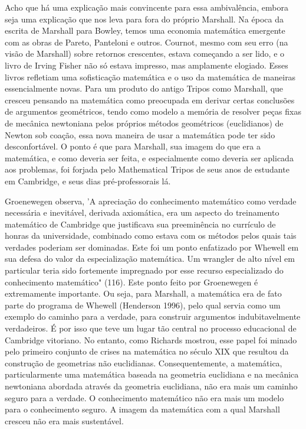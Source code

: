 \documentclass[12pt]{article}
\begin{document}
Acho que há uma explicação mais convincente para essa ambivalência, embora seja uma explicação que nos leva para fora do próprio Marshall. Na época da escrita de Marshall para Bowley, temos uma economia matemática emergente com as obras de Pareto, Panteloni e outros. Cournot, mesmo com seu erro (na visão de Marshall) sobre retornos crescentes, estava começando a ser lido, e o livro de Irving Fisher não só estava impresso, mas amplamente elogiado. Esses livros refletiam uma sofisticação matemática e o uso da matemática de maneiras essencialmente novas. Para um produto do antigo Tripos como Marshall, que cresceu pensando na matemática como preocupada em derivar certas conclusões de argumentos geométricos, tendo como modelo a memória de resolver peças fixas de mecânica newtoniana pelos próprios métodos geométricos (euclidianos) de Newton sob coação, essa nova maneira de usar a matemática pode ter sido desconfortável. O ponto é que para Marshall, sua imagem do que era a matemática, e como deveria ser feita, e especialmente como deveria ser aplicada aos problemas, foi forjada pelo Mathematical Tripos de seus anos de estudante em Cambridge, e seus dias pré-professorais lá.

Groenewegen observa, 'A apreciação do conhecimento matemático como verdade necessária e inevitável, derivada axiomática, era um aspecto do treinamento matemático de Cambridge que justificava sua preeminência no currículo de honras da universidade, combinado como estava com os métodos pelos quais tais verdades poderiam ser dominadas. Este foi um ponto enfatizado por Whewell em sua defesa do valor da especialização matemática. Um wrangler de alto nível em particular teria sido fortemente impregnado por esse recurso especializado do conhecimento matemático" (116). Este ponto feito por Groenewegen é extremamente importante. Ou seja, para Marshall, a matemática era de fato parte do programa de Whewell (Henderson 1996), pelo qual servia como um exemplo do caminho para a verdade, para construir argumentos indubitavelmente verdadeiros. É por isso que teve um lugar tão central no processo educacional de Cambridge vitoriano. No entanto, como Richards mostrou, esse papel foi minado pelo primeiro conjunto de crises na matemática no século XIX que resultou da construção de geometrias não euclidianas. Consequentemente, a matemática, particularmente uma matemática baseada na geometria euclidiana e na mecânica newtoniana abordada através da geometria euclidiana, não era mais um caminho seguro para a verdade. O conhecimento matemático não era mais um modelo para o conhecimento seguro. A imagem da matemática com a qual Marshall cresceu não era mais sustentável.
\end{document}
